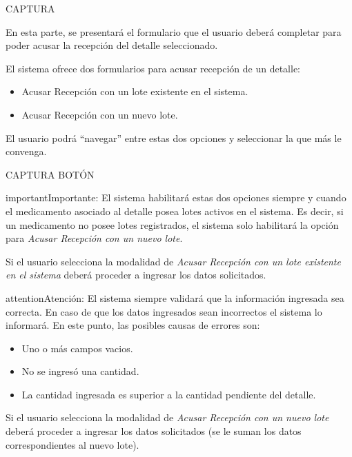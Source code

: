 \documentclass[a4paper,10pt,spanish]{sphinxmanual}
\begin{document}
CAPTURA

En esta parte, se presentará el formulario que el usuario deberá completar para poder acusar la recepción del detalle seleccionado.

El sistema ofrece dos formularios para acusar recepción de un detalle:
\begin{itemize}
\item {} 
Acusar Recepción con un lote existente en el sistema.

\item {} 
Acusar Recepción con un nuevo lote.

\end{itemize}

El usuario podrá ``navegar'' entre estas dos opciones y seleccionar la que más le convenga.

CAPTURA BOTÓN

\begin{notice}{important}{Importante:}
El sistema habilitará estas dos opciones siempre y cuando el medicamento asociado al detalle posea lotes activos en el sistema. Es decir, si un medicamento no posee lotes registrados, el sistema solo habilitará la opción para \emph{Acusar Recepción con un nuevo lote}.
\end{notice}

Si el usuario selecciona la modalidad de \emph{Acusar Recepción con un lote existente en el sistema} deberá proceder a ingresar los datos solicitados.

\begin{notice}{attention}{Atención:}
El sistema siempre validará que la información ingresada sea correcta. En caso de que los datos ingresados sean incorrectos el sistema lo informará.
En este punto, las posibles causas de errores son:
\begin{itemize}
\item {} 
Uno o más campos vacios.

\item {} 
No se ingresó una cantidad.

\item {} 
La cantidad ingresada es superior a la cantidad pendiente del detalle.

\end{itemize}
\end{notice}

Si el usuario selecciona la modalidad de \emph{Acusar Recepción con un nuevo lote} deberá proceder a ingresar los datos solicitados (se le suman los datos correspondientes al nuevo lote).
\end{document}
